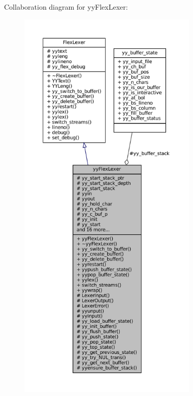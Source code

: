 Collaboration diagram for yy\+Flex\+Lexer\+:
\nopagebreak
\begin{figure}[H]
\begin{center}
\leavevmode
\includegraphics[height=550pt]{classyyFlexLexer__coll__graph}
\end{center}
\end{figure}
